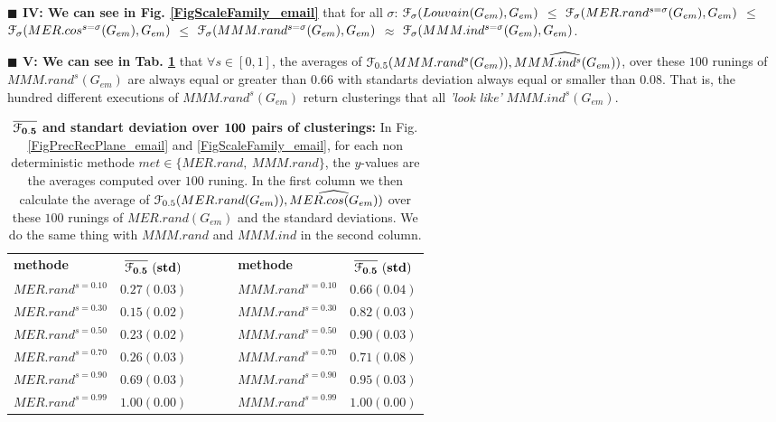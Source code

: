 \documentclass[12pt]{article}
\theoremstyle{thmstyleone}%
\theoremstyle{definition}
\begin{document}
\noindent
{\bf $\blacksquare$ IV: We can see in Fig. \ref{FigScaleFamily_email}} that for all $\sigma$:
%
$\EuScript{F}_{\sigma}(Louvain(G_{em}), G_{em})$ $\leqslant$ $\EuScript{F}_{\sigma}(MER.rand^{s=\sigma}(G_{em}), G_{em})$ $\leqslant$
$\EuScript{F}_{\sigma}(MER.cos^{s=\sigma}(G_{em}), G_{em})$ $\leqslant$ $\EuScript{F}_{\sigma}(MMM.rand^{s=\sigma}(G_{em}), G_{em})$ $\approx$
$\EuScript{F}_{\sigma}(MMM.ind^{s=\sigma}(G_{em}), G_{em})$.

\noindent
{\bf $\blacksquare$ V: We can see in Tab. \ref{tab_sur_determ}} that $\forall s \in [0,1]$, the averages of $\EuScript{F}_{0.5}(MMM.rand^{s}(G_{em})),\widehat{MMM.ind^{s}(G_{em})})$, over these $100$ runings of $MMM.rand^{s}(G_{em})$
are always equal or greater than $0.66$ with standarts deviation always equal or smaller than $0.08$. That is, the hundred different executions of $MMM.rand^{s}(G_{em})$ return clusterings that all {\it 'look like'} $MMM.ind^{s}(G_{em})$.
\begin{table}[!ht]
\centering
\begin{tabular}{| l  c | c | l  c |  }
  \cline{1-2} \cline{4-5}
  {\bf methode} & $\bf \stackrel{}{\overline{\EuScript{F}_{0.5}}~(std)}$ &~~~~& {\bf methode} & $\bf \stackrel{}{\overline{\EuScript{F}_{0.5}}~(std)}$  \\
  \cline{1-2} \cline{4-5}
  $MER.rand^{s=0.10}$& $0.27(0.03)$ &~~~~& $MMM.rand^{s=0.10}$ & $0.66(0.04)$\\
  \cline{1-2} \cline{4-5}
  $MER.rand^{s=0.30}$& $0.15(0.02)$ &~~~~& $MMM.rand^{s=0.30}$ & $0.82(0.03)$ \\
  \cline{1-2} \cline{4-5}
  $MER.rand^{s=0.50}$& $0.23(0.02)$ &~~~~& $MMM.rand^{s=0.50}$ & $0.90(0.03)$ \\
  \cline{1-2} \cline{4-5}
  $MER.rand^{s=0.70}$& $0.26(0.03)$ &~~~~& $MMM.rand^{s=0.70}$ & $0.71(0.08)$ \\
  \cline{1-2} \cline{4-5}
  $MER.rand^{s=0.90}$& $0.69(0.03)$ &~~~~& $MMM.rand^{s=0.90}$ & $0.95(0.03)$ \\
  \cline{1-2} \cline{4-5}
  $MER.rand^{s=0.99}$& $1.00(0.00)$ &~~~~& $MMM.rand^{s=0.99}$ & $1.00(0.00)$ \\
  \cline{1-2} \cline{4-5}
\end{tabular}
\bigskip
    \caption{{\bf $\bf \overline{\EuScript{F}_{0.5}}$ and standart deviation over $\bf 100$ pairs of clusterings:} In Fig. \ref{FigPrecRecPlane_email} and \ref{FigScaleFamily_email}, for each non deterministic methode $met \in \{MER.rand,~ MMM.rand\}$, the $y$-values are the averages computed over $100$ runing.
    In the first column we then calculate the average of $\EuScript{F}_{0.5}(MER.rand(G_{em})),\widehat{MER.cos(G_{em})})$ over these $100$ runings of $MER.rand(G_{em})$ and the standard deviations. We do the same thing with $MMM.rand$ and $MMM.ind$ in the second column.  \label{tab_sur_determ}}
\end{table}
\end{document}
